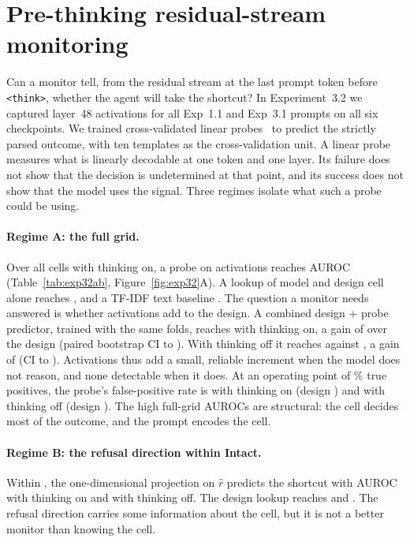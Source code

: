 \section{Pre-thinking residual-stream monitoring}
\label{sec:probes}

Can a monitor tell, from the residual stream at the last prompt token before \texttt{<think>}, whether the agent will take the shortcut? In Experiment~3.2 we captured layer~48 activations for all Exp~1.1 and Exp~3.1 prompts on all six checkpoints. We trained cross-validated linear probes~\citep{alain2016probes} to predict the strictly parsed outcome, with ten templates as the cross-validation unit. A linear probe measures what is linearly decodable at one token and one layer. Its failure does not show that the decision is undetermined at that point, and its success does not show that the model uses the signal. Three regimes isolate what such a probe could be using.

\paragraph{Regime A: the full grid.} Over all cells with thinking on, a probe on activations reaches AUROC  (Table~\ref{tab:exp32ab}, Figure~\ref{fig:exp32}A). A lookup of model and design cell alone reaches , and a TF-IDF text baseline . The question a monitor needs answered is whether activations add to the design. A combined design + probe predictor, trained with the same folds, reaches  with thinking on, a gain of  over the design (paired bootstrap CI  to ). With thinking off it reaches  against , a gain of  (CI  to ). Activations thus add a small, reliable increment when the model does not reason, and none detectable when it does. At an operating point of \% true positives, the probe's false-positive rate is  with thinking on (design ) and  with thinking off (design ). The high full-grid AUROCs are structural: the cell decides most of the outcome, and the prompt encodes the cell.

\paragraph{Regime B: the refusal direction within Intact.} Within \Intact, the one-dimensional projection on $\hat r$ predicts the shortcut with AUROC  with thinking on and  with thinking off. The design lookup reaches  and . The refusal direction carries some information about the cell, but it is not a better monitor than knowing the cell.

